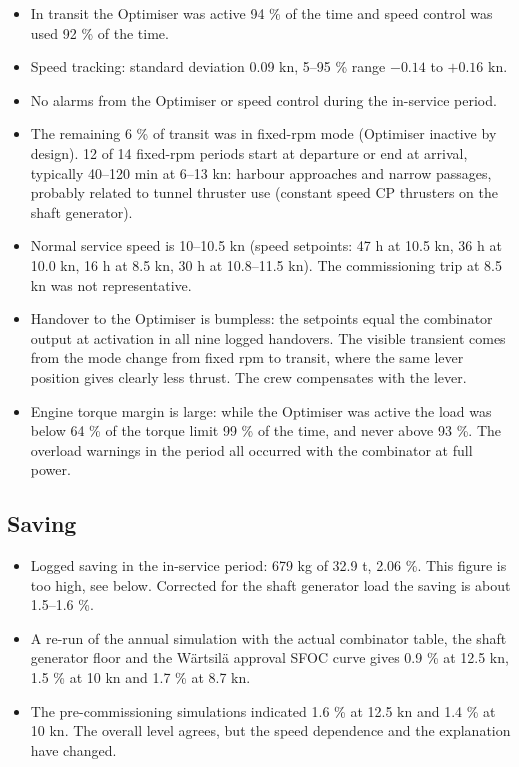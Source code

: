 \documentclass[a4paper,11pt]{article}
\begin{document}
\begin{itemize}
\item In transit the Optimiser was active 94 \% of the time and speed control
was used 92 \% of the time.
\item Speed tracking: standard deviation 0.09 kn, 5--95 \% range \(-0.14\) to
\(+0.16\) kn.
\item No alarms from the Optimiser or speed control during the in-service
period.
\item The remaining 6 \% of transit was in fixed-rpm mode (Optimiser
inactive by design).  12 of 14 fixed-rpm periods start at departure or
end at arrival, typically 40--120 min at 6--13 kn: harbour approaches
and narrow passages, probably related to tunnel thruster use (constant
speed CP thrusters on the shaft generator).
\item Normal service speed is 10--10.5 kn (speed setpoints: 47 h at 10.5 kn,
36 h at 10.0 kn, 16 h at 8.5 kn, 30 h at 10.8--11.5 kn).  The
commissioning trip at 8.5 kn was not representative.
\item Handover to the Optimiser is bumpless: the setpoints equal the
combinator output at activation in all nine logged handovers.  The
visible transient comes from the mode change from fixed rpm to
transit, where the same lever position gives clearly less thrust.  The
crew compensates with the lever.
\item Engine torque margin is large: while the Optimiser was active the load
was below 64 \% of the torque limit 99 \% of the time, and never above
93 \%.  The overload warnings in the period all occurred with the
combinator at full power.
\end{itemize}

\subsection{Saving}
\label{sec:orga3a5f2b}

\begin{itemize}
\item Logged saving in the in-service period: 679 kg of 32.9 t, 2.06 \%.
This figure is too high, see below.  Corrected for the shaft generator
load the saving is about 1.5--1.6 \%.
\item A re-run of the annual simulation with the actual combinator table,
the shaft generator floor and the Wärtsilä approval SFOC curve gives
0.9 \% at 12.5 kn, 1.5 \% at 10 kn and 1.7 \% at 8.7 kn.
\item The pre-commissioning simulations indicated 1.6 \% at 12.5 kn and
1.4 \% at 10 kn.  The overall level agrees, but the speed dependence and
the explanation have changed.
\end{itemize}
\end{document}
